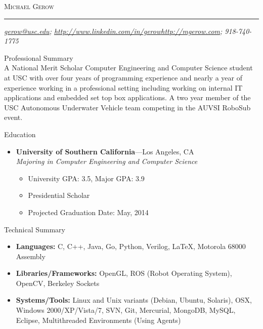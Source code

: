 \documentclass[10pt,oneside]{article}
\makeatletter
\newcommand{\name}{Michael Gerow}
\newcommand{\phone}{918-740-1775}
\newcommand{\email}{\href{mailto:gerow@usc.edu?subject=Hello}{gerow@usc.edu}}
\newcommand{\linkedin}{\href{http://www.linkedin.com/in/gerow}{http://www.linkedin.com/in/gerow}}
\newcommand{\website}{\href{http://mgerow.com}{http://mgerow.com}}
\newcommand{\bigname}[1]{
	\begin{center}\fontfamily{phv}\selectfont\Large\scshape#1\end{center}
}
\newenvironment{ressection}[1]{
	\vspace{4pt}
	{\fontfamily{phv}\selectfont\Large#1}
	\begin{itemize}
	\vspace{3pt}
}{
	\end{itemize}
}
\newcommand{\resplainsection}[1]{
	{\fontfamily{phv}\selectfont\Large#1}
	\vspace{-12pt}
	\\

}
\newcommand{\resitem}[1]{
	\vspace{-4pt}
	\item \begin{flushleft} #1 \end{flushleft}
}
\newcommand{\ressubitem}[1]{
	\vspace{-1pt}
	\item \begin{flushleft} #1 \end{flushleft}
}
\newcommand{\resbigitem}[3]{
	\vspace{-5pt}
	\item
	\textbf{#1}---#2 \\
	\textit{#3}
}
\newenvironment{ressubsec}[3]{
	\resbigitem{#1}{#2}{#3}
	\vspace{-2pt}
	\begin{itemize}
}{
	\end{itemize}
}
\makeatother
\begin{document}
 \selectfont

\bigname{\name}

\vspace{-8pt} \rule{\textwidth}{1pt}

\vspace{-1pt} {\small\itshape \email; \linkedin \hfill \website; \phone}

\vspace{8 pt}


\resplainsection{Professional Summary}
	A National Merit Scholar Computer Engineering and Computer Science student at USC with over four years of programming experience and nearly a year of experience working in a professional setting including working on internal IT applications and embedded set top box applications.  A two year member of the USC Autonomous Underwater Vehicle team competing in the AUVSI RoboSub event.

\begin{ressection}{Education}

	\begin{ressubsec}{University of Southern California}{Los Angeles, CA}{Majoring in Computer Engineering and Computer Science}
		\ressubitem{University GPA:  3.5, Major GPA: 3.9}
		\ressubitem{Presidential Scholar}
		\ressubitem{Projected Graduation Date:  May, 2014}
	\end{ressubsec}

\end{ressection}

\begin{ressection}{Technical Summary}

	\resitem{\textbf{Languages:} C, C++, Java, Go, Python, Verilog, \LaTeX, Motorola 68000 Assembly }
	\resitem{\textbf{Libraries/Frameworks:} OpenGL, ROS (Robot Operating System), OpenCV, Berkeley Sockets }
	\resitem{\textbf{Systems/Tools:} Linux and Unix variants (Debian, Ubuntu, Solaris), OSX, Windows 2000/XP/Vista/7, SVN, Git, Mercurial, MongoDB, MySQL, Eclipse, Multithreaded Environments (Using Agents)}
	
\end{ressection}


\end{document}
